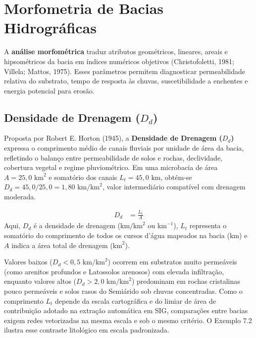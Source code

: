 \section{Morfometria de Bacias Hidrográficas}

A \textbf{análise morfométrica} traduz atributos geométricos, lineares, areais e hipsométricos da bacia em índices numéricos objetivos (Christofoletti, 1981; Villela; Mattos, 1975). Esses parâmetros permitem diagnosticar permeabilidade relativa do substrato, tempo de resposta às chuvas, suscetibilidade a enchentes e energia potencial para erosão.

\subsection{Densidade de Drenagem ($D_d$)}

Proposta por Robert E. Horton (1945), a \textbf{Densidade de Drenagem ($D_d$)} expressa o comprimento médio de canais fluviais por unidade de área da bacia, refletindo o balanço entre permeabilidade de solos e rochas, declividade, cobertura vegetal e regime pluviométrico. Em uma microbacia de área $A = 25{,}0\text{ km}^2$ e somatório dos canais $L_t = 45{,}0\text{ km}$, obtém-se $D_d = 45{,}0 / 25{,}0 = 1{,}80\text{ km}/\text{km}^2$, valor intermediário compatível com drenagem moderada.

\begin{boxFormula}
\begin{align*}
  D_d &= \frac{L_t}{A}
\end{align*}
Aqui, $D_d$ é a densidade de drenagem ($\text{km}/\text{km}^2$ ou $\text{km}^{-1}$), $L_t$ representa o somatório do comprimento de todos os cursos d'água mapeados na bacia ($\text{km}$) e $A$ indica a área total de drenagem ($\text{km}^2$).
\end{boxFormula}

Valores baixos ($D_d < 0{,}5\text{ km}/\text{km}^2$) ocorrem em substratos muito permeáveis (como arenitos profundos e Latossolos arenosos) com elevada infiltração, enquanto valores altos ($D_d > 2{,}0\text{ km}/\text{km}^2$) predominam em rochas cristalinas pouco permeáveis e solos rasos do Semiárido sob chuvas concentradas. Como o comprimento $L_t$ depende da escala cartográfica e do limiar de área de contribuição adotado na extração automática em SIG, comparações entre bacias exigem redes vetorizadas na mesma escala e sob o mesmo critério. O Exemplo 7.2 ilustra esse contraste litológico em escala padronizada.


